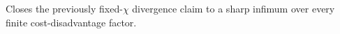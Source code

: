 Closes the previously fixed-\(\chi\) divergence claim to a sharp infimum over every finite cost-disadvantage factor.